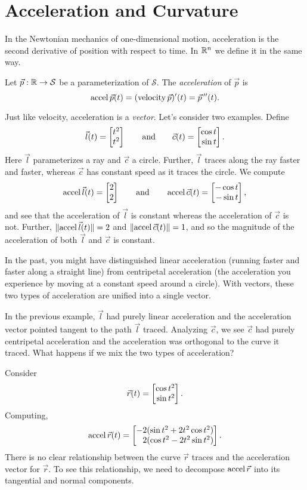 \begin{exercises}
\end{exercises}

\section{Acceleration and Curvature}
In the Newtonian mechanics of one-dimensional motion, acceleration is the second
derivative of position with respect to time.  In $\mathbb{R}^n$ we define it in the same way.

\begin{definition}[Acceleration]
	Let $\vec p:\mathbb{R}\to\mathcal S$ be a parameterization of $\mathcal S$.  The \emph{acceleration}
	of $\vec p$ is 
	\[
		\operatorname{accel} \vec p(t) = (\operatorname{velocity} \vec p)'(t)=\vec p\,''(t).
	\]
\end{definition}

Just like velocity, acceleration is a \emph{vector}.  Let's consider two examples.  Define
\[
	\vec l(t) = \mat{t^2\\t^2}\qquad\text{and}\qquad\vec c(t) = \mat{\cos t\\\sin t}.
\]
Here $\vec l$ parameterizes a ray and $\vec c$ a circle.  Further, $\vec l$ traces along the ray
faster and faster, whereas $\vec c$ has constant speed as it traces the circle.
We compute 
\[
	\Accel \vec l(t) = \mat{2\\2}\qquad\text{and}\qquad \Accel\vec c(t) = \mat{-\cos t\\ -\sin t},
\]
and see that the acceleration of $\vec l$ is constant whereas the acceleration of $\vec c$ is not.  Further,
$\lVert\operatorname{accel} \vec l(t)\rVert=2$ and $\lVert\operatorname{accel} \vec c(t)\rVert=1$, and so the magnitude of the acceleration of
both $\vec l$ and $\vec c$ is constant.

In the past, you might have distinguished linear acceleration (running faster and faster along a straight line) from
centripetal acceleration (the acceleration you experience by moving at a constant speed
around a circle).  With vectors, these two types of acceleration are unified into a single vector.  

In the previous example, $\vec l$ had purely linear acceleration and
the acceleration vector pointed tangent to the path $\vec l$ traced.
Analyzing $\vec c$, we see $\vec c$ had purely centripetal acceleration and the acceleration was orthogonal
to the curve it traced.
What happens if we mix the two types of acceleration?

Consider
\[
	\vec r(t)=\mat{\cos t^2\\\sin t^2}.
\]
Computing, 
\[
	\Accel \vec r(t) = \mat{-2(\sin t^2+2t^2\cos t^2)\\ 2(\cos t^2-2t^2\sin t^2)}.
\]
There is no clear relationship between the curve $\vec r$ traces and the acceleration vector
for $\vec r$.  To see this relationship, we need to decompose $\operatorname{accel} \vec r$ into its tangential
and normal components.

